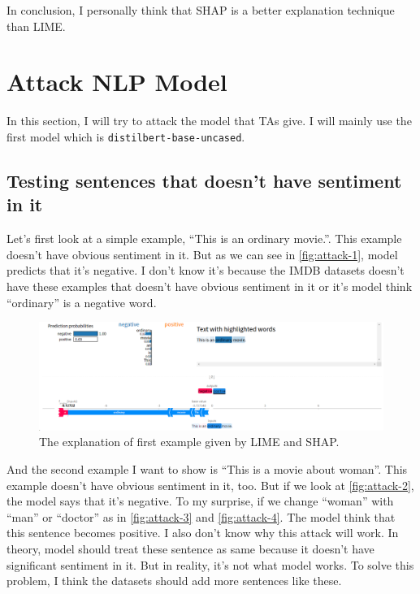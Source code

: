 \documentclass{article}[12pt]
\begin{document}
In conclusion, I personally think that SHAP is a better explanation technique than LIME.


\section{Attack NLP Model}

In this section, I will try to attack the model that TAs give. I will mainly use the first model which is \texttt{distilbert-base-uncased}.

\subsection{Testing sentences that doesn't have sentiment in it}
Let's first look at a simple example, ``This is an ordinary movie.''. This example doesn't have obvious sentiment in it. But as we can see in \autoref{fig:attack-1}, model predicts that it's negative. I don't know it's because the IMDB datasets doesn't have these examples that doesn't have obvious sentiment in it or it's model think ``ordinary'' is a negative word. 

\begin{figure}[htbp]
	\centering
	\includegraphics[width=\linewidth]{figure/attack-1}
	\caption{The explanation of first example given by LIME and SHAP.}
	\label{fig:attack-1}
\end{figure}

And the second example I want to show is ``This is a movie about woman''. This example doesn't have obvious sentiment in it, too. But if we look at \autoref{fig:attack-2}, the model says that it's negative. To my surprise, if we change ``woman'' with ``man'' or ``doctor'' as in \autoref{fig:attack-3} and \autoref{fig:attack-4}. The model think that this sentence becomes positive. I also don't know why this attack will work. In theory, model should treat these sentence as same because it doesn't have significant sentiment in it. But in reality, it's not what model works. To solve this problem, I think the datasets should add more sentences like these.
\end{document}
